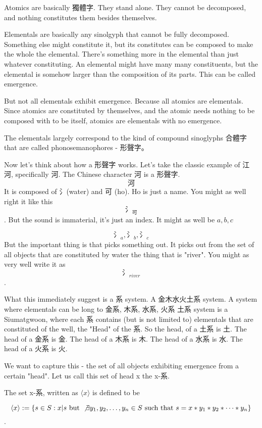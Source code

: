Atomics are basically 獨體字. They stand alone. They cannot be decomposed, and nothing constitutes them besides themselves.

Elementals are basically any sinolgyph that cannot be fully decomposed. Something else might constitute it, but its constitutes can be composed to make the whole the elemental. There's something more in the elemental than just whatever constituting. An elemental might have many many constituents, but the elemental is somehow larger than the composition of its parts. This can be called emergence. 

But not all elementals exhibit emergence. Because all atomics are elementals. Since atomics are constituted by themselves, and the atomic needs nothing to be composed with to be itself, atomics are elementals with no emergence. 


The elementals largely correspond to the kind of compound sinoglyphs 合體字 that are called phonosemanophores - 形聲字。 

Now let's think about how a 形聲字 works. Let's take the classic example of 江河, specifically 河. The Chinese character 河 is a 形聲字. 
$$\text{河}$$
It is composed of 氵(water) and 可 (ho). Ho is just a name. You might as well right it like this $$\text{氵}_{\text{可}}$$. But the sound is immaterial, it's just an index. It might as well be $a,b,c$

$$\text{氵}_{a},\text{氵}_b,\text{氵}_c$$
But the important thing is that picks something out. It picks out from the set of all objects that are constituted by water the thing that is "river". You might as very well write it as $$\text{氵}_{river}$$. 

What this immediately suggest is a 系 system. A 金木水火土系 system. A system where elementals can be long to 金系, 木系, 水系, 火系 土系 system is a Siumatgwoon, where each 系 contains (but is not limited to) elementals that are constituted of the well, the "Head" of the 系. So the head, of a 土系 is 土. The head of a 金系 is 金. The head of a 木系 is 木. The head of a 水系 is 水. The head of a 火系 is 火. 

We want to capture this - the set of all objects exhibiting emergence from a certain "head". Let us call this set of head x the x-系. 



\begin{definition}\label{def:hai-elements}
    The set x-系, written as $\langle x \rangle$ is defined to be 
    
    $$\langle x \rangle := \{ s\in S: x|s \text{ but } \not \exists y_1, y_2,\ldots, y_n \in S \text{ such that } s=x*y_1*y_2*\cdots*y_n\}$$. 
    \end{definition}

